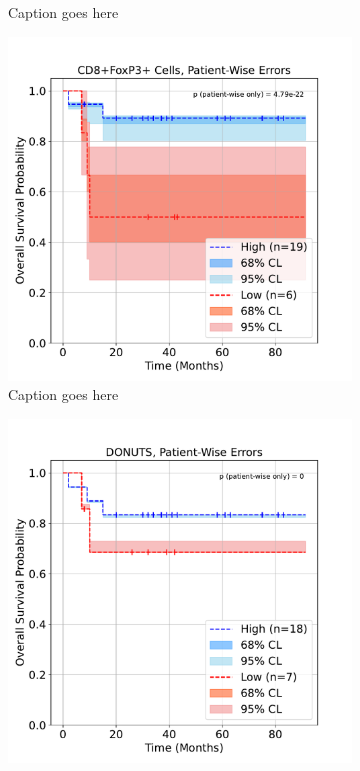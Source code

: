\documentclass[article]{jss}
\begin{document}
\begin{figure}
\begin{subfigure}[t]{0.49\textwidth}
    \caption{\label{fig:lung-dataset-donuts} Caption goes here}
  \end{subfigure}
  \begin{subfigure}[t]{0.49\textwidth}
    \centering
    \includegraphics[width=\linewidth]{lung_cells_km_OS_patient_wise.pdf}
    \caption{\label{fig:lung-dataset-cells-patient-wise} Caption goes here}
  \end{subfigure}
  \begin{subfigure}[t]{0.49\textwidth}
    \centering
    \includegraphics[width=\linewidth]{lung_donuts_km_OS_patient_wise.pdf}

\end{subfigure}
\end{figure}
\end{document}

